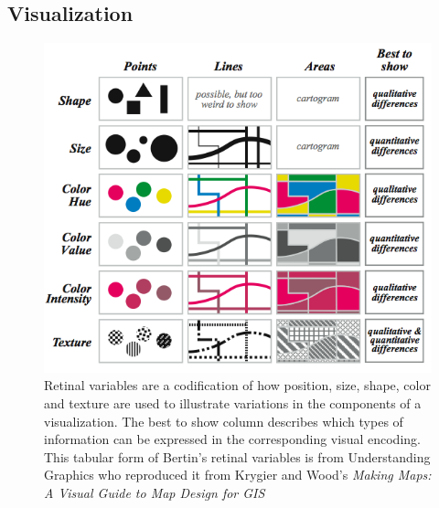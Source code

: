 \documentclass[../main.tex]{subfiles}
\begin{document}
\subsection{Visualization}
\label{sec:intro_viz}
\begin{figure}[H]
\includegraphics[width=1\textwidth]{figures/intro/retinal_variables.png}
\caption{Retinal variables are a codification of how position, size, shape, color and texture are used to illustrate variations in the components of a visualization. The best to show column describes which types of information can be expressed in the corresponding visual encoding. This tabular form of Bertin's retinal variables is from Understanding Graphics \cite{malamedInformationDisplayTips2010} who reproduced it from Krygier and Wood's \textit{Making Maps: A Visual Guide to Map Design for GIS} 
\cite{krygierMakingMapsVisual2005}}
\label{fig:intro_retinal_variables}
\end{figure}
\end{document}
